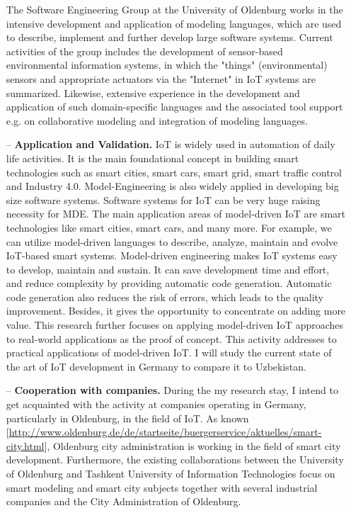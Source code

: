 \documentclass[10pt, oneside]{article}
\begin{document}
\begin{itemize}
The Software Engineering Group at the University of Oldenburg works in the intensive development and application of modeling languages, which are used to describe, implement and further develop large software systems. Current activities of the group includes the development of sensor-based environmental information systems, in which the "things" (environmental) sensors and appropriate actuators via the "Internet" in IoT systems are summarized. Likewise, extensive experience in the development and application of such domain-specific languages and the associated tool support e.g. on collaborative modeling and integration of modeling languages.
\item[--] \textbf{Application and Validation.} IoT is widely used in automation of daily life activities. It is the main foundational concept in building smart technologies such as smart cities, smart cars, smart grid, smart traffic control and Industry 4.0. Model-Engineering is also widely applied in developing big size software systems. Software systems for IoT can be very huge raising necessity for MDE. The main application areas of model-driven IoT are smart technologies like smart cities, smart cars, and many more. For example, we can utilize model-driven languages to describe, analyze, maintain and evolve IoT-based smart systems. Model-driven engineering makes IoT systems easy to develop, maintain and sustain. It can save development time and effort, and reduce complexity by providing automatic code generation. Automatic code generation also reduces the risk of errors, which leads to the quality improvement. Besides, it gives the opportunity to concentrate on adding more value. This research further focuses on applying model-driven IoT approaches to real-world applications as the proof of concept. This activity addresses to practical applications of model-driven IoT. I will study the current state of the art of IoT development in Germany to compare it to Uzbekistan.
\item[--] \textbf{Cooperation with companies.} During the my research stay, I intend to get acquainted with the activity at companies operating in Germany, particularly in Oldenburg, in the field of IoT. As known [\url{http://www.oldenburg.de/de/startseite/buergerservice/aktuelles/smart-city.html}], Oldenburg city administration is working in the field of smart city development. Furthermore, the existing collaborations between the University of Oldenburg and Tashkent University of Information Technologies focus on smart modeling and smart city subjects together with several industrial companies and the City Administration of Oldenburg.
\end{itemize}
\end{document}
